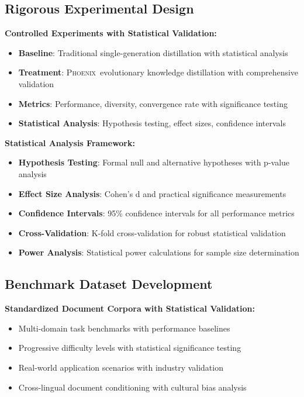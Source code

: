 \documentclass[10pt]{article}
\theoremstyle{definition}
\newcommand{\phoenix}{\textsc{Phoenix}}
\begin{document}
\subsection{Rigorous Experimental Design}

\textbf{Controlled Experiments with Statistical Validation:}

\begin{itemize}
    \item \textbf{Baseline}: Traditional single-generation distillation with statistical analysis
    \item \textbf{Treatment}: \phoenix\ evolutionary knowledge distillation with comprehensive validation
    \item \textbf{Metrics}: Performance, diversity, convergence rate with significance testing
    \item \textbf{Statistical Analysis}: Hypothesis testing, effect sizes, confidence intervals
\end{itemize}

\textbf{Statistical Analysis Framework:}

\begin{itemize}
    \item \textbf{Hypothesis Testing}: Formal null and alternative hypotheses with p-value analysis
    \item \textbf{Effect Size Analysis}: Cohen's d and practical significance measurements
    \item \textbf{Confidence Intervals}: 95\% confidence intervals for all performance metrics
    \item \textbf{Cross-Validation}: K-fold cross-validation for robust statistical validation
    \item \textbf{Power Analysis}: Statistical power calculations for sample size determination
\end{itemize}

\subsection{Benchmark Dataset Development}

\textbf{Standardized Document Corpora with Statistical Validation:}

\begin{itemize}
    \item Multi-domain task benchmarks with performance baselines
    \item Progressive difficulty levels with statistical significance testing
    \item Real-world application scenarios with industry validation
    \item Cross-lingual document conditioning with cultural bias analysis
\end{itemize}
\end{document}
